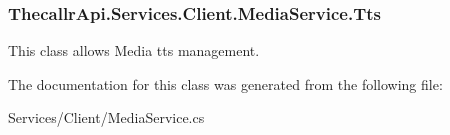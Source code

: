 \hypertarget{class_thecallr_api_1_1_services_1_1_client_1_1_media_service_a4b8075ed42ba760aea9598f48471c0f5}{
\subsubsection[{Tts}]{ Thecallr\+Api.\+Services.\+Client.\+Media\+Service.\+Tts\hspace{0.3cm}{\ttfamily [get]}}}\label{class_thecallr_api_1_1_services_1_1_client_1_1_media_service_a4b8075ed42ba760aea9598f48471c0f5}


This class allows Media tts management. 



The documentation for this class was generated from the following file\+:\begin{DoxyCompactItemize}
\item 
Services/\+Client/Media\+Service.\+cs\end{DoxyCompactItemize}
